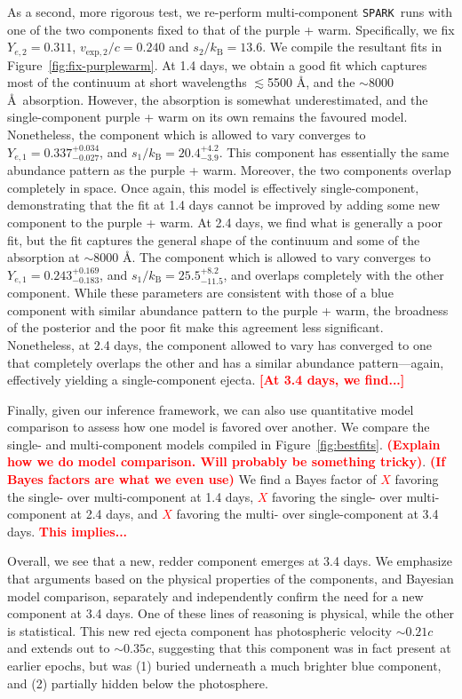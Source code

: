 \documentclass[twocolumn,twocolappendix]{aastex63}
\def\SPARK{\texttt{SPARK}}
\newcommand\redbf[1]{\textbf{\textcolor{red}{#1}}}
\begin{document}
As a second, more rigorous test, we re-perform multi-component \SPARK~runs with one of the two components fixed to that of the purple + warm. Specifically, we fix $Y_{e,2} = 0.311$, $v_{\mathrm{exp},2}/c = 0.240$ and $s_2 / k_{\mathrm{B}} = 13.6$. We compile the resultant fits in Figure~\ref{fig:fix-purplewarm}. At 1.4 days, we obtain a good fit which captures most of the continuum at short wavelengths $\lesssim$5500 \AA, and the $\sim$8000 \AA~absorption. However, the absorption is somewhat underestimated, and the single-component purple + warm on its own remains the favoured model. Nonetheless, the component which is allowed to vary converges to $Y_{e,1} = 0.337^{+0.034}_{-0.027}$, and $s_1 / k_{\mathrm{B}} = 20.4^{+4.2}_{-3.9}$. This component has essentially the same abundance pattern as the purple + warm. Moreover, the two components overlap completely in space. Once again, this model is effectively single-component, demonstrating that the fit at 1.4 days cannot be improved by adding some new component to the purple + warm. At 2.4 days, we find what is generally a poor fit, but the fit captures the general shape of the continuum and some of the absorption at $\sim$8000 \AA. The component which is allowed to vary converges to $Y_{e,1} = 0.243^{+0.169}_{-0.183}$, and $s_1 / k_{\mathrm{B}} = 25.5^{+8.2}_{-11.5}$, and overlaps completely with the other component. While these parameters are consistent with those of a blue component with similar abundance pattern to the purple + warm, the broadness of the posterior and the poor fit make this agreement less significant. Nonetheless, at 2.4 days, the component allowed to vary has converged to one that completely overlaps the other and has a similar abundance pattern---again, effectively yielding a single-component ejecta. \redbf{[At 3.4 days, we find...]} 

Finally, given our inference framework, we can also use quantitative model comparison to assess how one model is favored over another. We compare the single- and multi-component models compiled in Figure~\ref{fig:bestfits}. \redbf{(Explain how we do model comparison. Will probably be something tricky)}. \redbf{(If Bayes factors are what we even use)} We find a Bayes factor  of \redbf{$X$} favoring the single- over multi-component at 1.4 days, \redbf{$X$} favoring the single- over multi-component at 2.4 days, and \redbf{$X$} favoring the multi- over single-component at 3.4 days. \redbf{This implies...}

Overall, we see that a new, redder component emerges at 3.4 days. We emphasize that arguments based on the physical properties of the components, and Bayesian model comparison, separately and independently confirm the need for a new component at 3.4 days. One of these lines of reasoning is physical, while the other is statistical. This new red ejecta component has photospheric velocity $\sim$$0.21c$ and extends out to $\sim$$0.35c$, suggesting that this component was in fact present at earlier epochs, but was (1) buried underneath a much brighter blue component, and (2) partially hidden below the photosphere. 
\end{document}
